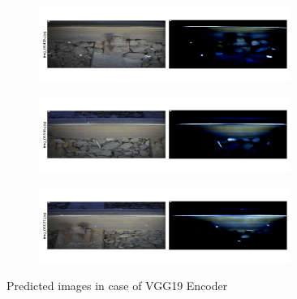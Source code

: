 \begin{figure}[H]
    \centering
    \begin{subfigure}{\textwidth}
        \centering
        \includegraphics[width=0.9\textwidth,trim={0 1cm 0 1cm},clip]{./results/vgg19_vgg19/20230510_172958_predict_0.png}
    \end{subfigure}
    \begin{subfigure}{\textwidth}
        \centering
        \includegraphics[width=0.9\textwidth,trim={0 1cm 0 1cm},clip]{./results/vgg19_vgg19/20230510_172958_predict_1.png}
    \end{subfigure}
    \begin{subfigure}{\textwidth}
        \centering
        \includegraphics[width=0.9\textwidth,trim={0 1cm 0 1cm},clip]{./results/vgg19_vgg19/20230510_172958_predict_2.png}
    \end{subfigure}
    \caption{Predicted images in case of VGG19 Encoder}
    \label{fig:vgg19_examples}
\end{figure}


